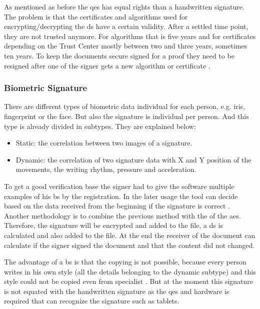 As mentioned as before the \gls{qes} has equal rights than a handwritten signature. The problem is that the certificates and algorithms used for encrypting/decrypting the \gls{ds} have a certain validity. After a settled time point, they are not trusted anymore. For algorithms that is five years and for certificates depending on the Trust Center mostly between two and three years, sometimes ten years. To keep the documents secure signed for a proof they need to be resigned after one of the signer gets a new algorithm or certificate \parencite{Steffens2018Gueltigkeit}.

\subsubsection{Biometric Signature}
There are different types of biometric data individual for each person, e.g. iris, fingerprint or the face. But also the signature is individual per person. And this type is already divided in subtypes. They are explained below:
\begin{itemize}
	\item Static: the correlation between two images of a signature.
	\item Dynamic: the correlation of two signature data with X and Y position of the movements, the writing rhythm, pressure and acceleration.
\end{itemize}
\parencite{biometric2017types,bayometric2018}

To get a good verification base the signer had to give the software multiple examples of his \gls{bs} by the registration. In the later usage the tool can decide based on the data received from the beginning if the signature is correct \parencite{bayometric2018}. Another methodology is to combine the previous method with the of the \gls{aes}. Therefore, the signature will be encrypted and added to the file, a \gls{ds} is calculated and also added to the file. At the end the receiver of the document can calculate if the signer signed the document and that the content did not changed. 

The advantage of a \gls{bs} is that the copying is not possible, because every person writes in his own style (all the details belonging to the dynamic subtype) and this style could not be copied even from specialist \parencite{Schmitz2004}. But at the moment this signature is not equated with the handwritten signature as the \gls{qes} and hardware is required that can recognize the signature such as tablets.

